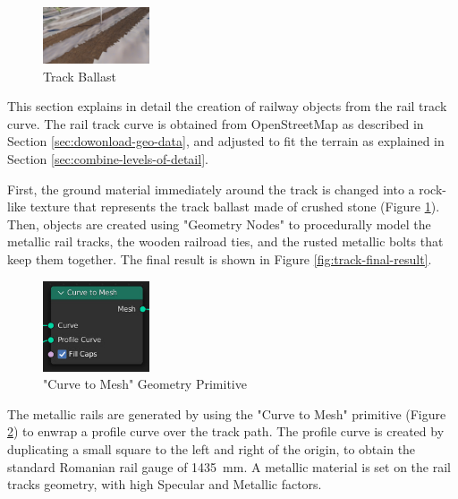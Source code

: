 \begin{figure}
    \centering
    \includegraphics[width=0.28\textwidth]{src/img/procedural-tracks/1-trackbed.jpg}
    \caption{Track Ballast}
    \label{fig:track-ballast-pic}
\end{figure}

This section explains in detail the creation of railway objects from the rail track curve. The rail track curve is obtained from OpenStreetMap as described in Section \ref{sec:dowonload-geo-data}, and adjusted to fit the terrain as explained in Section \ref{sec:combine-levels-of-detail}.


First, the ground material immediately around the track is changed into a rock-like texture that represents the track ballast made of crushed stone (Figure \ref{fig:track-ballast-pic}). Then, objects are created using "Geometry Nodes" to procedurally model the metallic rail tracks, the wooden railroad ties, and the rusted metallic bolts that keep them together. The final result is shown in Figure \ref{fig:track-final-result}.

\begin{figure}
    \centering
    \includegraphics[width=0.28\textwidth]{src/img/procedural-tracks/3a-rails-curve-to-mesh.jpg}
    \caption{"Curve to Mesh" Geometry Primitive}
    \label{fig:track-curve-to-mesh-primitive}
\end{figure}




The metallic rails are generated by using the "Curve to Mesh" primitive (Figure \ref{fig:track-curve-to-mesh-primitive}) to enwrap a profile curve over the track path. The profile curve is created by duplicating a small square to the left and right of the origin, to obtain the standard Romanian rail gauge of 1435 mm. A metallic material is set on the rail tracks geometry, with high Specular and Metallic factors.



